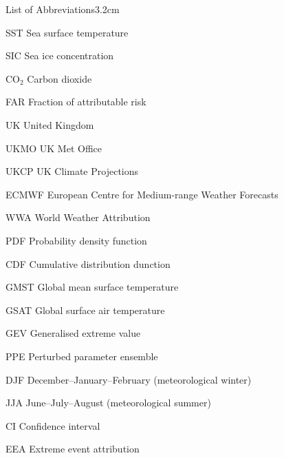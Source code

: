 \begin{mclistof}{List of Abbreviations}{3.2cm}

    \item[SST] Sea surface temperature
    \item[SIC] Sea ice concentration
    \item[CO$_2$] Carbon dioxide
    \item[FAR] Fraction of attributable risk
    \item[UK] United Kingdom
    \item[UKMO] UK Met Office
    \item[UKCP] UK Climate Projections
    \item[ECMWF] European Centre for Medium-range Weather Forecasts
    \item[WWA] World Weather Attribution
    \item[PDF] Probability density function
    \item[CDF] Cumulative distribution dunction
    \item[GMST] Global mean surface temperature
    \item[GSAT] Global surface air temperature
    \item[GEV] Generalised extreme value
    \item[PPE] Perturbed parameter ensemble
    \item[DJF] December--January--February (meteorological winter)
    \item[JJA] June--July--August (meteorological summer)
    \item[CI] Confidence interval 
    \item[EEA] Extreme event attribution

\end{mclistof}
